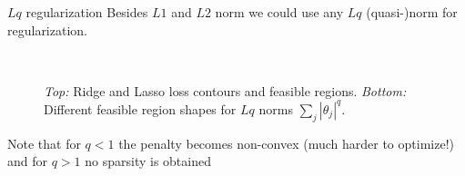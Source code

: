 \documentclass[11pt,compress,t,notes=noshow, xcolor=table]{beamer}
\begin{document}
\begin{vbframe}{$Lq$ regularization}
Besides $L1$ and $L2$ norm we could use any $Lq$ (quasi-)norm for regularization.


\begin{figure}
  \\
\caption{\textit{Top:} Ridge and Lasso loss contours and feasible regions.
\textit{Bottom:} Different feasible region shapes for $Lq$ norms $\sum_j |\theta_j|^q$.}
\end{figure}

Note that for $q<1$ the penalty becomes non-convex (much harder to optimize!) and for $q>1$ no sparsity is obtained

\end{vbframe}
\end{document}
